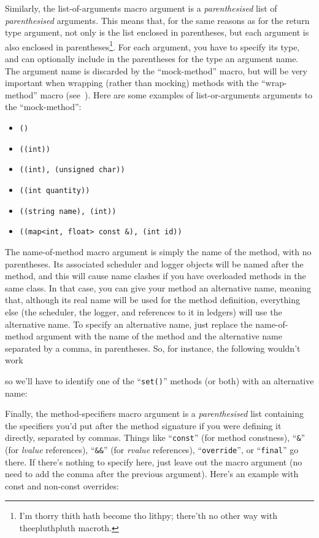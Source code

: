 \documentclass[twoside, a4paper, article]{memoir}
\providecommand\typesetexample[1]{%
}
\begin{document}
Similarly, the list-of-arguments macro argument is a \emph{parenthesised} list
of \emph{parenthesised} arguments.  This means that, for the same reasons as
for the return type argument, not only is the list enclosed in parentheses, but
each argument is also enclosed in parentheses\footnote{I'm thorry thith hath
  become tho lithpy; there'th no other way with theepluthpluth macroth.}.  For
each argument, you have to specify its type, and can optionally include in the
parentheses for the type an argument name.  The argument name is discarded by
the ``mock-method'' macro, but will be very important when wrapping (rather
than mocking) methods with the ``wrap-method'' macro
(see~).  Here are some examples of list-or-arguments
arguments to the ``mock-method'':
\begin{itemize}
\item \texttt{()}
\item \texttt{((int))}
\item \texttt{((int), (unsigned char))}
\item \texttt{((int quantity))}
\item \texttt{((string name), (int))}
\item \texttt{((map<int, float> const \&), (int id))}
\end{itemize}

The name-of-method macro argument is simply the name of the method, with no
parentheses.  Its associated scheduler and logger objects will be named after
the method, and this will cause name clashes if you have overloaded methods in
the same class.  In that case, you can give your method an alternative name,
meaning that, although its real name will be used for the method definition,
everything else (the scheduler, the logger, and references to it in ledgers)
will use the alternative name.  To specify an alternative name, just replace
the name-of-method argument with the name of the method and the alternative
name separated by a comma, in parentheses.  So, for instance, the following
wouldn't work

\typesetexample{mock-class-name-clash}

so we'll have to identify one of the ``\texttt{set()}'' methods (or both) with
an alternative name:

\typesetexample{mock-class-name-clash-avoided}

Finally, the method-specifiers macro argument is a \emph{parenthesised} list
containing the specifiers you'd put after the method signature if you were
defining it directly, separated by commas.  Things like ``\texttt{const}'' (for
method constness), ``\texttt{\&}'' (for \emph{lvalue} references),
``\texttt{\&\&}'' (for \emph{rvalue} references), ``\texttt{override}'', or
``\texttt{final}'' go there.  If there's nothing to specify here, just leave
out the macro argument (no need to add the comma after the previous argument).
Here's an example with const and non-const overrides:
\end{document}
